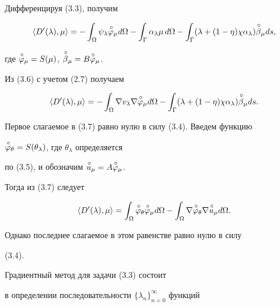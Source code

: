  


\begin{pf}


Дифференцируя (3.3), получим 


\begin{equation} 


\la D'(\lambda),\mu\ra=-\int_\Omega\psi_\lambda\up{\varphi}_\mu 


d\Omega-\int_\Gamma \alpha_\lambda\mu\,d\Omega-\int_\Gamma 


(\lambda+(1-\eta)\chi\alpha_\lambda)\up{\beta}_\mu ds, 


\end{equation} 


где $\overset{\,\circ}{\varphi}{}_\mu=S(\mu)$, $\overset{\,\circ}{\beta}{}_\mu=B\overset{\,\circ}{\varphi}{}_\mu$. 


Из (3.6) с учетом (2.7) получаем 


\begin{equation} 


\la D'(\lambda),\mu\ra=-\int_\Omega\nabla v_\lambda\nabla 


\up{\varphi}_\mu d\Omega-\int_\Gamma(\lambda+(1-\eta)\chi\alpha_\lambda) 


\up{\beta}_\mu ds. 


\end{equation} 


Первое слагаемое в (3.7) равно нулю в силу (3.4). Введем функцию 


$\overset{\,\circ}{\varphi}{}_\theta=S(\theta_\lambda)$, где $\theta_\lambda$ определяется 


по (3.5), и обозначим $\overset{\,\circ}{u}{}_\mu=A\overset{\,\circ}{\varphi}{}_\mu$. 


Тогда из (3.7) следует 


$$ 


\la D'(\lambda),\mu\ra=\int_\Omega\up{\varphi}_\theta 


\up{\varphi}_\mu d\Omega-\int_\Omega\nabla 


\up{\varphi}_\theta\nabla\up{u}_\mu d\Omega. 


$$ 


Однако последнее слагаемое в этом равенстве равно нулю в силу 


(3.4).


\end{pf}


 


Градиентный метод для задачи (3.3) состоит 


в определении последовательности $\{\lambda_n\}^\infty_{n=0}$ функций 


